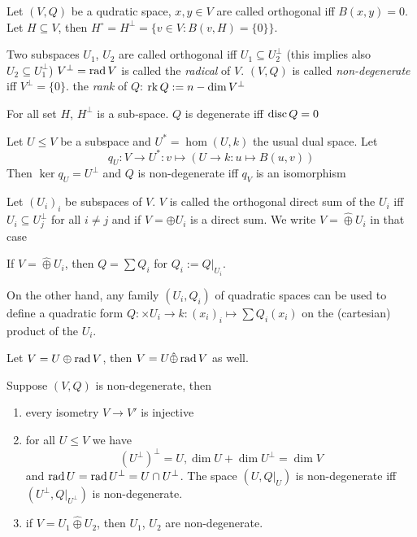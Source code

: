 \begin{definition}
Let $(V, Q)$ be a qudratic space, $x, y\in V$ are called orthogonal iff $B(x, y) = 0$.
Let $H\subseteq V$, then
$H^\circ = H^\perp = \{v\in V:B(v, H) =\{0\}\}$.

Two subspaces $U_1$, $U_2$ are called orthogonal iff
$U_1\subseteq U_2^\perp$ (this implies also $U_2\subseteq U_1^\perp$)
$V^\perp =\mathop{\rm rad}\nolimits V$ is called the {\em radical} of $V$.
$(V, Q)$ is called {\em non-degenerate} iff $V^\perp = \{0\}$.
the {\em rank} of $Q$: $\mathop{\rm rk}\nolimits Q := n-\dim V^\perp$
\end{definition}

\begin{remark}
For all set $H$, $H^\perp$ is a sub-space. $Q$ is degenerate iff
$\mathop{\rm disc}\nolimits Q = 0$
\end{remark}

\begin{remark}\label{1.7}
Let $U \le V$ be a subspace and $U^* = \hom(U, k)$ the usual dual space. Let
$$q_U: V\to U^*: v\mapsto (U\to k: u\mapsto B(u, v))$$
Then $\ker q_U = U^\perp$ and $Q$ is non-degenerate iff $q_V$ is an isomorphism
\end{remark}

\begin{definition}
Let $(U_i)_i$ be subspaces of $V$. $V$ is called the orthogonal
direct sum of the $U_i$ iff $U_i \subseteq U_j^\perp$ for all $i\ne j$ and
if $V = \oplus U_i$ is a direct sum. We write $V = \hat\oplus U_i$ in that 
case
\end{definition}

\begin{remark}
If $V = \hat\oplus U_i$, then $Q = \sum Q_i$ for
$Q_i := Q|_{U_i}$.

On the other hand, any family $(U_i, Q_i)$ of quadratic spaces can be used to define a quadratic form $Q: \times U_i \to k: (x_i)_i \mapsto \sum Q_i(x_i)$
on the (cartesian) product of the $U_i$.
\end{remark}

\begin{proposition}
Let $V = U \oplus \mathop{\rm rad}\nolimits V$, then $V = U \hat\oplus \mathop{\rm rad}\nolimits V$ as well.
\end{proposition}
\begin{proposition}
Suppose $(V, Q)$ is non-degenerate, then
\begin{enumerate}
\item every isometry $V\to V'$ is injective
\item for all $U\le V$ we have
$$(U^\perp)^\perp = U, \dim U + \dim U^\perp =\dim V$$
and $\mathop{\rm rad}\nolimits U = \mathop{\rm rad}\nolimits U^\perp = U \cap U^\perp$.
The space $(U, Q|_U)$ is non-degenerate iff $(U^\perp, Q|_{U^\perp})$
is non-degenerate.
\item if $V = U_1 \hat\oplus U_2$, then $U_1$, $U_2$ are non-degenerate.
\end{enumerate}
\end{proposition}

